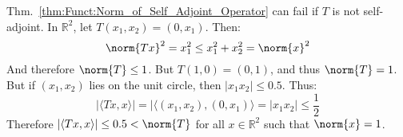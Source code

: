 \documentclass[crop=false,class=book,oneside]{standalone}
\begin{document}
            Thm.~\ref{thm:Funct:Norm_of_Self_Adjoint_Operator} can
            fail if $T$ is not self-adjoint. In $\mathbb{R}^{2}$, let
            $T(x_{1},x_{2})=(0,x_{1})$. Then:
            \begin{equation*}
                \norm{Tx}^{2}=x_{1}^{2}\leq{x_{1}^{2}+x_{2}^{2}}
                =\norm{x}^{2}
            \end{equation*}
            And therefore $\norm{T}\leq{1}$. But $T(1,0)=(0,1)$, and
            thus $\norm{T}=1$. But if $(x_{1},x_{2})$ lies on the
            unit circle, then $|x_{1}x_{2}|\leq0.5$. Thus:
            \begin{equation*}
                |\langle{Tx,x}\rangle|
                =|\langle(x_{1},x_{2}),(0,x_{1})\rangle
                =|x_{1}x_{2}|\leq\frac{1}{2}
            \end{equation*}
            Therefore $|\langle{Tx,x}\rangle|\leq{0.5}<\norm{T}$ for
            all $x\in\mathbb{R}^{2}$ such that $\norm{x}=1$.
\end{document}
